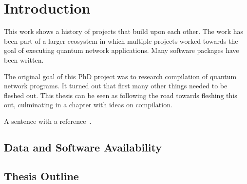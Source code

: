 \chapter{Introduction}
\label{chp:intro}

This work shows a history of projects that build upon each other.
The work has been part of a larger ecosystem in which multiple projects worked towards the goal of executing quantum network applications.
Many software packages have been written.

The original goal of this PhD project was to research compilation of quantum network programs.
It turned out that first many other things needed to be fleshed out.
This thesis can be seen as following the road towards fleshing this out, culminating in a chapter with ideas on compilation.

\lipsum[40-50]
A sentence with a reference~\cite{dahlberg_2022_netqasm}.


\section{Data and Software Availability}
\lipsum[51]


\section{Thesis Outline}
\lipsum[52]


\begin{xstretch}
\printbibliography[heading=subbibintoc,title={References},notcategory=noprint]
\end{xstretch}
